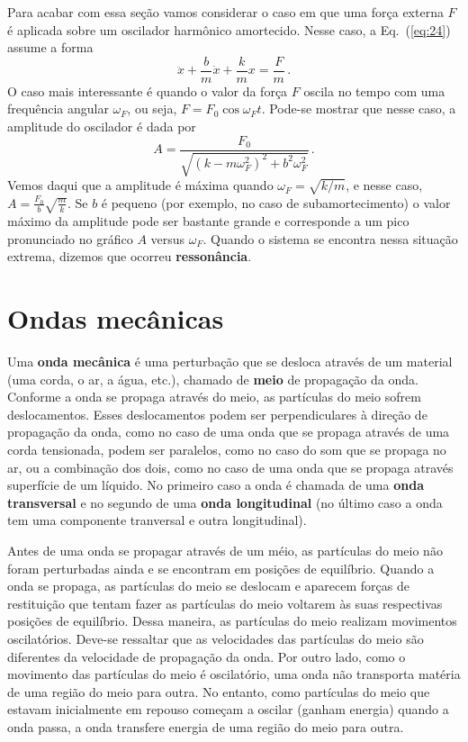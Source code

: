 \documentclass[twocolumn=on,fontsize=12pt,DIV=calc]{scrartcl}
\theoremstyle{definition}
\begin{document}
Para acabar com essa seção vamos considerar o caso em que uma força
externa $F$ é aplicada sobre um oscilador harmônico amortecido. Nesse
caso, a Eq.~(\ref{eq:24}) assume a forma
$$\ddot x+\frac{b}{m}\dot x+\frac{k}{m}x=\frac{F}{m}\,.$$
O caso mais interessante é quando o valor da força $F$ oscila no tempo
com uma frequência angular $\omega_F$, ou seja,
$F=F_0\cos\omega_Ft$. Pode-se mostrar que nesse caso, a amplitude do
oscilador é dada por
$$A=\frac{F_0}{\sqrt{(k-m\omega_F^2)^2+b^2\omega_F^2}}\,.$$
Vemos daqui que a amplitude é máxima quando $\omega_F=\sqrt{k/m}$, e
nesse caso, $A=\frac{F_0}{b}\sqrt{\frac{m}{k}}$. Se $b$ é pequeno (por
exemplo, no caso de subamortecimento) o valor máximo da amplitude pode
ser bastante grande e corresponde a um pico pronunciado no gráfico $A$
versus $\omega_F$. Quando o sistema se encontra nessa situação
extrema, dizemos que ocorreu \textbf{ressonância}.

\section{Ondas mecânicas}

Uma \textbf{onda mecânica} é uma perturbação que se desloca através de
um material (uma corda, o ar, a água, etc.), chamado de \textbf{meio}
de propagação da onda. Conforme a onda se propaga através do meio, as
partículas do meio sofrem deslocamentos. Esses deslocamentos podem ser
perpendiculares à direção de propagação da onda, como no caso de uma
onda que se propaga através de uma corda tensionada, podem ser
paralelos, como no caso do som que se propaga no ar, ou a combinação
dos dois, como no caso de uma onda que se propaga através superfície
de um líquido. No primeiro caso a onda é chamada de uma \textbf{onda
  transversal} e no segundo de uma \textbf{onda longitudinal} (no
último caso a onda tem uma componente tranversal e outra
longitudinal).

Antes de uma onda se propagar através de um méio, as partículas do
meio não foram perturbadas ainda e se encontram em posições de
equilíbrio. Quando a onda se propaga, as partículas do meio se
deslocam e aparecem forças de restituição que tentam fazer as
partículas do meio voltarem às suas respectivas posições de
equilíbrio. Dessa maneira, as partículas do meio realizam movimentos
oscilatórios. Deve-se ressaltar que as velocidades das partículas do
meio são diferentes da velocidade de propagação da onda. Por outro
lado, como o movimento das partículas do meio é oscilatório, uma onda
não transporta matéria de uma região do meio para outra. No entanto,
como partículas do meio que estavam inicialmente em repouso começam a
oscilar (ganham energia) quando a onda passa, a onda transfere energia
de uma região do meio para outra.
\end{document}
